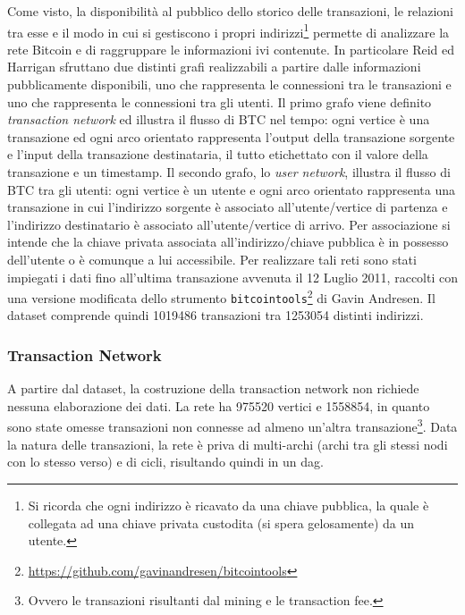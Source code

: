 Come visto, la disponibilità al pubblico dello storico delle transazioni, le relazioni tra esse e il modo in cui si gestiscono i propri indirizzi\footnote{Si ricorda che ogni indirizzo è ricavato da una chiave pubblica, la quale è collegata ad una chiave privata custodita (si spera gelosamente) da un utente.} permette di analizzare la rete Bitcoin e di raggruppare le informazioni ivi contenute.
In particolare Reid ed Harrigan sfruttano due distinti grafi realizzabili a partire dalle informazioni pubblicamente disponibili, uno che rappresenta le connessioni tra le transazioni e uno che rappresenta le connessioni tra gli utenti.
Il primo grafo viene definito \emph{transaction network} ed illustra il flusso di BTC nel tempo: ogni vertice è una transazione ed ogni arco orientato rappresenta l'output della transazione sorgente e l'input della transazione destinataria, il tutto etichettato con il valore della transazione e un timestamp.
Il secondo grafo, lo \emph{user network}, illustra il flusso di BTC tra gli utenti: ogni vertice è un utente e ogni arco orientato rappresenta una transazione in cui l'indirizzo sorgente è associato all'utente/vertice di partenza e l'indirizzo destinatario è associato all'utente/vertice di arrivo. Per associazione si intende che la chiave privata associata all'indirizzo/chiave pubblica è in possesso dell'utente o è comunque a lui accessibile.
Per realizzare tali reti sono stati impiegati i dati fino all'ultima transazione avvenuta il 12 Luglio 2011, raccolti con una versione modificata dello strumento \verb|bitcointools|\footnote{\url{https://github.com/gavinandresen/bitcointools} } di Gavin Andresen. Il dataset comprende quindi 1019486 transazioni tra 1253054 distinti indirizzi.

\subsubsection{Transaction Network}

A partire dal dataset, la costruzione della transaction network non richiede nessuna elaborazione dei dati.
La rete ha 975520 vertici e 1558854, in quanto sono state omesse transazioni non connesse ad almeno un'altra transazione\footnote{Ovvero le transazioni risultanti dal mining e le transaction fee.}. Data la natura delle transazioni, la rete è priva di multi-archi (archi tra gli stessi nodi con lo stesso verso) e di cicli, risultando quindi in un \gls{dag}.

